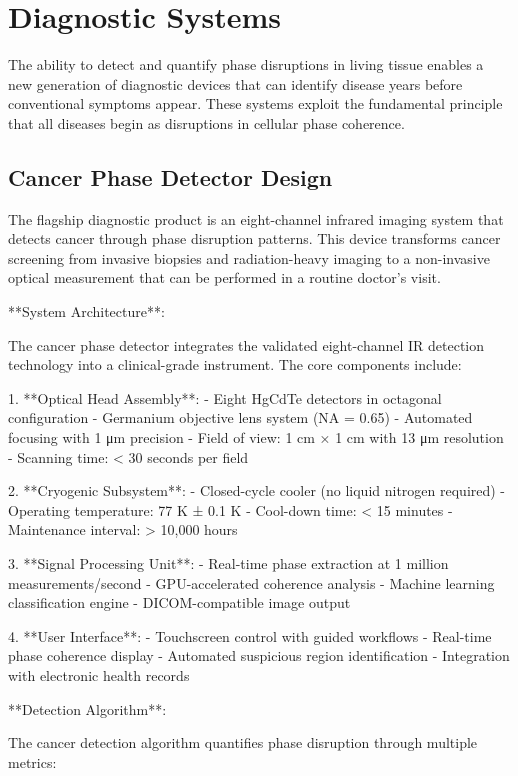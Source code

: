 \documentclass[12pt,a4paper]{report}
\begin{document}
\section{Diagnostic Systems}

The ability to detect and quantify phase disruptions in living tissue enables a new generation of diagnostic devices that can identify disease years before conventional symptoms appear. These systems exploit the fundamental principle that all diseases begin as disruptions in cellular phase coherence.

\subsection{Cancer Phase Detector Design}

The flagship diagnostic product is an eight-channel infrared imaging system that detects cancer through phase disruption patterns. This device transforms cancer screening from invasive biopsies and radiation-heavy imaging to a non-invasive optical measurement that can be performed in a routine doctor's visit.

**System Architecture**:

The cancer phase detector integrates the validated eight-channel IR detection technology into a clinical-grade instrument. The core components include:

1. **Optical Head Assembly**:
   - Eight HgCdTe detectors in octagonal configuration
   - Germanium objective lens system (NA = 0.65)
   - Automated focusing with 1 μm precision
   - Field of view: 1 cm × 1 cm with 13 μm resolution
   - Scanning time: < 30 seconds per field

2. **Cryogenic Subsystem**:
   - Closed-cycle cooler (no liquid nitrogen required)
   - Operating temperature: 77 K ± 0.1 K
   - Cool-down time: < 15 minutes
   - Maintenance interval: > 10,000 hours

3. **Signal Processing Unit**:
   - Real-time phase extraction at 1 million measurements/second
   - GPU-accelerated coherence analysis
   - Machine learning classification engine
   - DICOM-compatible image output

4. **User Interface**:
   - Touchscreen control with guided workflows
   - Real-time phase coherence display
   - Automated suspicious region identification
   - Integration with electronic health records

**Detection Algorithm**:

The cancer detection algorithm quantifies phase disruption through multiple metrics:
\end{document}
